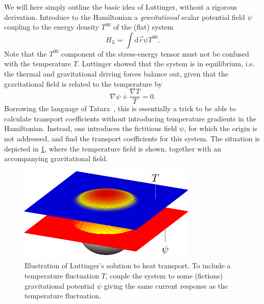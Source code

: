 We will here simply outline the basic idea of Luttinger, without a rigorous derivation.
Introduce to the Hamiltonian a \emph{gravitational} scalar potential field $\psi$ coupling to the energy density $T^{00}$ of the (flat) system~\cite{luttingerTheoryThermalTransport1964}
\begin{equation}
  \label{eq:luttinger-term}
  H_L = \int \mathrm{d}\vec{r} \psi T^{00}.
\end{equation}
Note that the $T^{00}$ component of the stress-energy tensor must not be confused with the temperature $T$.
Luttinger showed that the system is in equilibrium, i.e. the thermal and gravitational driving forces balance out, given that the gravitational field is related to the temperature by
\begin{equation}
  \label{eq:balance}
  \nabla\psi + \frac{\nabla T}{T} = 0.
\end{equation}
Borrowing the language of Tatara~\cite{tataraThermalVectorPotential2015}, this is essentially a trick to be able to calculate transport coefficients without introducing temperature gradients in the Hamiltonian.
Instead, one introduces the fictitious field $\psi$, for which the origin is not addressed, and find the transport coefficients for this system.
The situation is depicted in \cref{fig:luttinger-idea}, where the temperature field is shown, together with an accompanying gravitational field.
\begin{figure}[h]
  \centering
  \includegraphics{figures/LinearResponse_bump}
  \caption{Illustration of Luttinger's solution to heat transport. To include a temperature fluctuation $T$, couple the system to some (fictions) gravitational potential $\psi$ giving the same current response as the temperature fluctuation.}
  \label{fig:luttinger-idea}
\end{figure}

